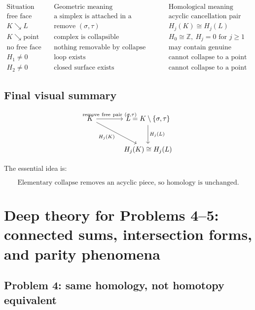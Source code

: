 \documentclass[12pt,a4paper]{article}
\theoremstyle{notespace}
\begin{document}
\[
\begin{array}{c|c|c}
	\text{Situation} & \text{Geometric meaning} & \text{Homological meaning} \\
	\hline
	\text{free face exists}
	&
	\text{a simplex is attached in a removable way}
	&
	\text{acyclic cancellation pair}
	\\
	\hline
	K\searrow L
	&
	\text{remove }(\sigma,\tau)
	&
	H_j(K)\cong H_j(L)
	\\
	\hline
	K\searrow \text{point}
	&
	\text{complex is collapsible}
	&
	H_0\cong \mathbb Z,\ H_j=0\text{ for }j\geq 1
	\\
	\hline
	\text{no free face}
	&
	\text{nothing removable by collapse}
	&
	\text{may contain genuine cycles}
	\\
	\hline
	H_1\neq 0
	&
	\text{loop exists}
	&
	\text{cannot collapse to a point}
	\\
	\hline
	H_2\neq 0
	&
	\text{closed surface exists}
	&
	\text{cannot collapse to a point}
\end{array}
\]

\subsection{Final visual summary}


\[
\begin{tikzcd}[column sep=large,row sep=large]
	K
	\arrow[r, "{\mathrm{remove\ free\ pair}\ (\sigma,\tau)}"]
	\arrow[dr, swap, "{H_j(K)}"]
	&
	L=K\setminus\{\sigma,\tau\}
	\arrow[d, "{H_j(L)}"]
	\\
	& H_j(K)\cong H_j(L)
\end{tikzcd}
\]


The essential idea is:

\[
\boxed{
	\text{Elementary collapse removes an acyclic piece, so homology is unchanged.}
}
\]


\section{Deep theory for Problems 4--5: connected sums, intersection forms, and parity phenomena}

\subsection{Problem 4: same homology, not homotopy equivalent}
\end{document}
